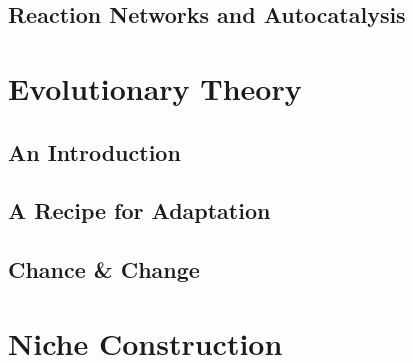 \documentclass[]{article}
\begin{document}
\subsection{Reaction Networks and Autocatalysis}

\section{Evolutionary Theory}

\subsection{An Introduction}

\subsection{A Recipe for Adaptation}

\subsection{Chance \& Change}

\section{Niche Construction}


\printglossaries

 


\end{document}
